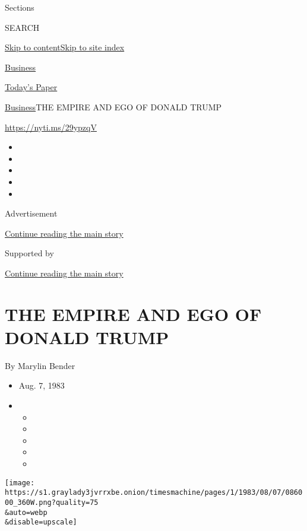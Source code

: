 Sections

SEARCH

\protect\hyperlink{site-content}{Skip to
content}\protect\hyperlink{site-index}{Skip to site index}

\href{https://www.nytimes3xbfgragh.onion/section/business}{Business}

\href{https://myaccount.nytimes3xbfgragh.onion/auth/login?response_type=cookie\&client_id=vi}{}

\href{https://www.nytimes3xbfgragh.onion/section/todayspaper}{Today's
Paper}

\href{/section/business}{Business}\textbar{}THE EMPIRE AND EGO OF DONALD
TRUMP

\url{https://nyti.ms/29ypzqV}

\begin{itemize}
\item
\item
\item
\item
\item
\end{itemize}

Advertisement

\protect\hyperlink{after-top}{Continue reading the main story}

Supported by

\protect\hyperlink{after-sponsor}{Continue reading the main story}

\hypertarget{the-empire-and-ego-of-donald-trump}{%
\section{THE EMPIRE AND EGO OF DONALD
TRUMP}\label{the-empire-and-ego-of-donald-trump}}

By Marylin Bender

\begin{itemize}
\item
  Aug. 7, 1983
\item
  \begin{itemize}
  \item
  \item
  \item
  \item
  \item
  \end{itemize}
\end{itemize}

\texttt{[image: https://s1.graylady3jvrrxbe.onion/timesmachine/pages/1/1983/08/07/086000\_360W.png?quality=75\\\&auto=webp\\\&disable=upscale]}

